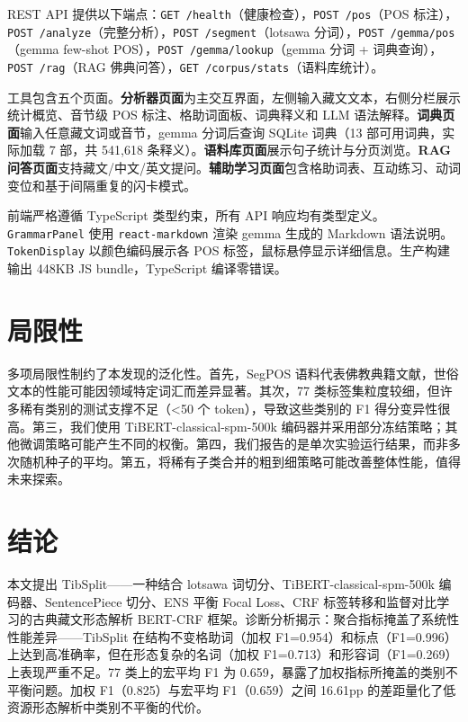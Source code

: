 \documentclass[11pt,a4paper]{article}
\begin{document}
REST API 提供以下端点：\texttt{GET /health}（健康检查），\texttt{POST /pos}（POS 标注），\texttt{POST /analyze}（完整分析），\texttt{POST /segment}（lotsawa 分词），\texttt{POST /gemma/pos}（gemma few-shot POS），\texttt{POST /gemma/lookup}（gemma 分词 + 词典查询），\texttt{POST /rag}（RAG 佛典问答），\texttt{GET /corpus/stats}（语料库统计）。

工具包含五个页面。\textbf{分析器页面}为主交互界面，左侧输入藏文文本，右侧分栏展示统计概览、音节级 POS 标注、格助词面板、词典释义和 LLM 语法解释。\textbf{词典页面}输入任意藏文词或音节，gemma 分词后查询 SQLite 词典（13 部可用词典，实际加载 7 部，共 541,618 条释义）。\textbf{语料库页面}展示句子统计与分页浏览。\textbf{RAG 问答页面}支持藏文/中文/英文提问。\textbf{辅助学习页面}包含格助词表、互动练习、动词变位和基于间隔重复的闪卡模式。

前端严格遵循 TypeScript 类型约束，所有 API 响应均有类型定义。\texttt{GrammarPanel} 使用 \texttt{react-markdown} 渲染 gemma 生成的 Markdown 语法说明。\texttt{TokenDisplay} 以颜色编码展示各 POS 标签，鼠标悬停显示详细信息。生产构建输出 448KB JS bundle，TypeScript 编译零错误。

\section{局限性}

多项局限性制约了本发现的泛化性。首先，SegPOS 语料代表佛教典籍文献，世俗文本的性能可能因领域特定词汇而差异显著。其次，77 类标签集粒度较细，但许多稀有类别的测试支撑不足（<50 个 token），导致这些类别的 F1 得分变异性很高。第三，我们使用 TiBERT-classical-spm-500k 编码器并采用部分冻结策略；其他微调策略可能产生不同的权衡。第四，我们报告的是单次实验运行结果，而非多次随机种子的平均。第五，将稀有子类合并的粗到细策略可能改善整体性能，值得未来探索。

\section{结论}

本文提出 TibSplit——一种结合 lotsawa 词切分、TiBERT-classical-spm-500k 编码器、SentencePiece 切分、ENS 平衡 Focal Loss、CRF 标签转移和监督对比学习的古典藏文形态解析 BERT-CRF 框架。诊断分析揭示：聚合指标掩盖了系统性性能差异——TibSplit 在结构不变格助词（加权 F1=0.954）和标点（F1=0.996）上达到高准确率，但在形态复杂的名词（加权 F1=0.713）和形容词（F1=0.269）上表现严重不足。77 类上的宏平均 F1 为 0.659，暴露了加权指标所掩盖的类别不平衡问题。加权 F1（0.825）与宏平均 F1（0.659）之间 16.61pp 的差距量化了低资源形态解析中类别不平衡的代价。
\end{document}
